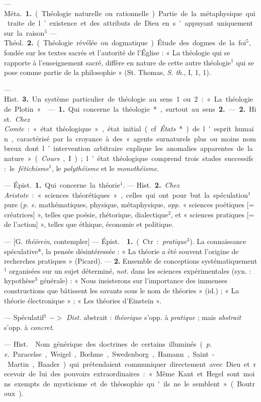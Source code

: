 \begin{itemize}[leftmargin=1cm, label=, itemsep=1pt]
 — \si{Méta.} {\bf 1.} (Théologie naturelle ou rationnelle).
Partie de la métaphysique qui traite de l’existence et des attributs de Dieu
en s'appuyant uniquement sur la raison$^5$ — \si{Théol.} {\bf 2.} (Théologie
révélée ou dogmatique). Étude des dogmes de la foi$^5$, fondée sur les textes
sacrés et l'autorité de l’Église : « La théologie qui se rapporte à
l’enseignement sacré, diffère en nature de cette autre théologie$^1$ qui se
pose comme partie de la philosophie » (St. Thomas, {\it S. th.}, I, 1, 1).

— \si{Hist.} {\bf 3.} Un système particulier de théologie au sens 1 ou 2 : «
La théologie de Plotin. »

 — {\bf 1.} Qui concerne la théologie*, surtout au sens
{\bf 2.} —  {\bf 2.} \si{Hist.} {\it Chez Comte} : « état théologique », état
initial (cf. {\it États}*) de
l'esprit humain, caractérisé par la croyance à des « agents surnaturels plus
ou moins nombreux dont l’intervention arbitraire explique les anomalies
apparentes de la nature » ({\it Cours}, I) ; l’état théologique comprend
trois stades successifs : le {\it fétichisme}$^1$, le {\it polythéisme} et le
{\it monothéisme}.

 — \si{Épist.} {\bf 1.} Qui concerne la théorie$^1$. —
\si{Hist.} {\bf 2.} {\it Chez Aristote} : « sciences théorétiques », celles
qui ont pour but la spéculation$^1$ pure ({\it p. e.} mathématiques,
physique, métaphysique, {\it opp.} « sciences poétiques [= créatrices] »,
telles que poésie, rhétorique, dialectique$^2$, et « sciences pratiques [= de
l'action] », telles que éthique, économie et politique.

 — [G. {\it théôrein}, contempler] — \si{Épist.} 
{\bf 1.} (Ctr. : {\it pratique}$^3$). La connaissance spéculative*, la pensée
désintéressée : « La théorie a été souvent l’origine de recherches pratiques
» (Picard). —  {\bf 2.} Ensemble de conceptions
systématiquement$^1$ organisées sur un sujet déterminé, {\it not.} dans les
sciences expérimentales (syn. : hypothèse$^3$ générale) : « Nous insisterons
sur l'importance des immenses constructions que bâtissent les savants sous le
nom de théories » (id.) ; « La théorie électronique » ; « Les théories
d’Einstein ».

 — Spéculatif$^1$ $->$ {\it Dist.} abstrait : {\it théorique}
s’opp. à {\it pratique} ; mais {\it abstrait} s'opp. à {\it concret}.

 — \si{Hist.}  Nom générique des doctrines de
certains illuminés ({\it p. e.} Paracelse, Weigel, Bœhme, Swedenborg, Hamann,
Saint-Martin, Baader) qui prétendaient communiquer directement avec Dieu et
recevoir de lui des pouvoirs extraordinaires :
« Même Kant et Hegel sont moins exempts de mysticisme et de théosophie qu'ils
ne le semblent » (Boutroux).


\end{itemize}
